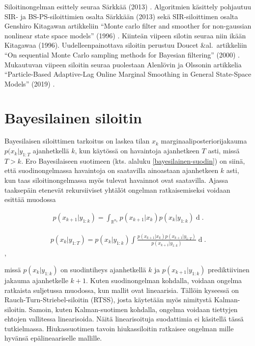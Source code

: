 \documentclass[
  12pt,
  a4paper, twoside]{book}
\begin{document}
Siloitinongelman esittely seuraa Särkkää (2013) \citep{sarkka-2013}. Algoritmien käsittely pohjautuu SIR- ja BS-PS-siloittimien osalta Särkkään (2013) \citep{sarkka-2013} sekä SIR-siloittimen osalta Genshiro Kitagawan artikkeliin ``Monte carlo filter and smoother for non-gaussian nonlinear state space models'' (1996) \citep{kitagawa-1996}. Kiinteän viipeen silotin seuraa niin ikään Kitagawaa (1996). Uudelleenpainottava siloitin perustuu Doucet \&al.~artikkeliin ``On sequential Monte Carlo sampling methods for Bayesian filtering'' (2000) \citep{Doucet-2000}. Mukautuvan viipeen siloitin seuraa puolestaan Alenlövin ja Olssonin artikkelia ``Particle-Based Adaptive-Lag Online Marginal Smoothing in General State-Space Models'' (2019) \citep{alenlov-2019}.

\section{Bayesilainen siloitin}

Bayesilaisen siloittimen tarkoitus on laskea tilan \(x_k\) marginaaliposteriorijakauma \(p(x_k|y_{1:T}\) ajanhetkellä \(k\), kun käytössä on havaintoja ajanhetkeen \(T\) asti, missä \(T>k\). Ero Bayesilaiseen suotimeen (kts. alaluku \ref{bayesilainen-suodin}) on siinä, että suodinongelmassa havaintoja on saatavilla ainoastaan ajanhetkeen \(k\) asti, kun taas siloitinongelmassa myös tulevat havainnot ovat saatavilla. Ajassa taaksepäin etenevät rekursiiviset yhtälöt ongelman ratkaisemiseksi voidaan esittää muodossa

\begin{align}\label{siloitin-prediktiivinen}
p(x_{k+1}|y_{1:k})=\int_{\mathbb{R}^{n_x}}p(x_{k+1}|x_k)p(x_k|y_{1:k})\mathop{dx_k}.
\end{align}

\begin{align}\label{siloitin-ratkaisu}
p(x_k|y_{1:T}) = p(x_k|y_{1:k}) \int \frac{p(x_{k+1}|x_k)p(x_{k+1}|y_{1:T})}{p(x_{k+1}|y_{1:k})} \mathop{dx_{k+1}}.
\end{align},

missä \(p(x_k|y_{1:k})\) on suodintiheys ajanhetkellä \(k\) ja \(p(x_{k+1}|y_{1:k})\) prediktiivinen jakauma ajanhetkelle \(k+1\). Kuten suodinongelman kohdalla, voidaan ongelma ratkaista suljetussa muodossa, kun mallit ovat lineaarisia. Tällöin kyseessä on Rauch-Turn-Striebel-siloitin (RTSS), josta käytetään myös nimitystä Kalman-siloitin. Samoin, kuten Kalman-suotimen kohdalla, ongelma voidaan tiettyjen ehtojen vallitessa linearisoida. Näitä linearisoituja suodattimia ei käsitellä tässä tutkielmassa. Hiukassuotimen tavoin hiukassiloitin ratkaisee ongelman mille hyvänsä epälineaariselle mallille.
\end{document}
